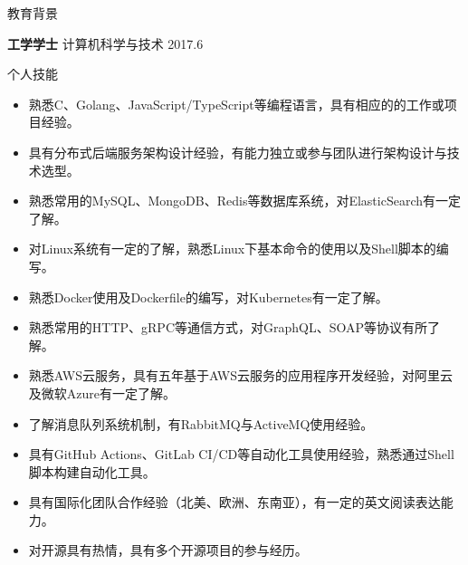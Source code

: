 \documentclass{resume} %
\begin{document}

\begin{rSection}{教育背景}

  {\bf 工学学士} 计算机科学与技术 \hfill {2017.6}

\end{rSection}

\begin{rSection}{个人技能}
  \begin{itemize}
    \itemsep -3pt {}
    \item 熟悉C、Golang、JavaScript/TypeScript等编程语言，具有相应的的工作或项目经验。
    \item 具有分布式后端服务架构设计经验，有能力独立或参与团队进行架构设计与技术选型。
    \item 熟悉常用的MySQL、MongoDB、Redis等数据库系统，对ElasticSearch有一定了解。
    \item 对Linux系统有一定的了解，熟悉Linux下基本命令的使用以及Shell脚本的编写。
    \item 熟悉Docker使用及Dockerfile的编写，对Kubernetes有一定了解。
    \item 熟悉常用的HTTP、gRPC等通信方式，对GraphQL、SOAP等协议有所了解。
    \item 熟悉AWS云服务，具有五年基于AWS云服务的应用程序开发经验，对阿里云及微软Azure有一定了解。
    \item 了解消息队列系统机制，有RabbitMQ与ActiveMQ使用经验。
    \item 具有GitHub Actions、GitLab CI/CD等自动化工具使用经验，熟悉通过Shell脚本构建自动化工具。
    \item 具有国际化团队合作经验（北美、欧洲、东南亚），有一定的英文阅读表达能力。
    \item 对开源具有热情，具有多个开源项目的参与经历。
  \end{itemize}
\end{rSection}
\end{document}
